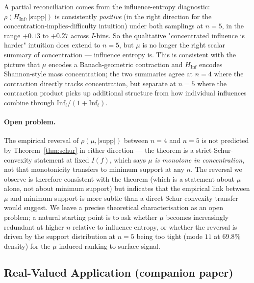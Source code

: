 \documentclass[11pt]{article}
\newcommand{\Inf}{\mathrm{Inf}}
\newcommand{\supp}{\mathrm{supp}}
\begin{document}
A partial reconciliation comes from the influence-entropy diagnostic: $\rho(H_{\Inf}, |\supp|)$ is consistently \emph{positive} (in the right direction for the concentration-implies-difficulty intuition) under both samplings at $n=5$, in the range $+0.13$ to $+0.27$ across $I$-bins. So the qualitative "concentrated influence is harder" intuition does extend to $n=5$, but $\mu$ is no longer the right scalar summary of concentration --- influence entropy is. This is consistent with the picture that $\mu$ encodes a Banach-geometric contraction and $H_{\Inf}$ encodes Shannon-style mass concentration; the two summaries agree at $n=4$ where the contraction directly tracks concentration, but separate at $n=5$ where the contraction product picks up additional structure from how individual influences combine through $\Inf_\ell/(1+\Inf_\ell)$.

\paragraph{Open problem.}
The empirical reversal of $\rho(\mu, |\supp|)$ between $n=4$ and $n=5$ is not predicted by Theorem~\ref{thm:schur} in either direction --- the theorem is a strict-Schur-convexity statement at fixed $I(f)$, which says \emph{$\mu$ is monotone in concentration}, not that monotonicity transfers to minimum support at any $n$. The reversal we observe is therefore consistent with the theorem (which is a statement about $\mu$ alone, not about minimum support) but indicates that the empirical link between $\mu$ and minimum support is more subtle than a direct Schur-convexity transfer would suggest. We leave a precise theoretical characterisation as an open problem; a natural starting point is to ask whether $\mu$ becomes increasingly redundant at higher $n$ relative to influence entropy, or whether the reversal is driven by the support distribution at $n=5$ being too tight (mode $11$ at $69.8\%$ density) for the $\mu$-induced ranking to surface signal.

\subsection{Real-Valued Application (companion paper)}
\label{sec:llm_validation}
\end{document}
